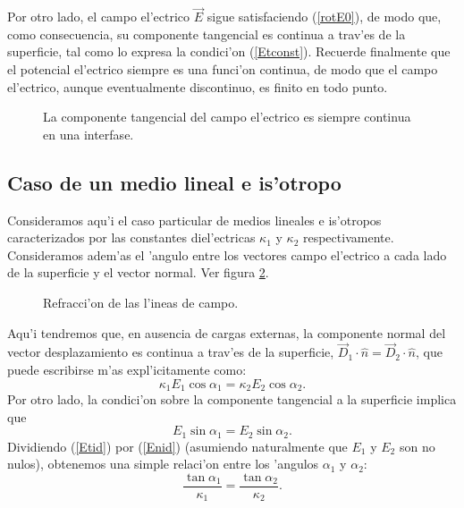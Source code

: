 Por otro lado, el campo el'ectrico $\vec{E}$ sigue satisfaciendo (\ref{rotE0}),
de modo que, como consecuencia, su componente tangencial es continua a trav'es
de la superficie, tal como lo expresa la condici'on (\ref{Etconst}). Recuerde
finalmente que el potencial el'ectrico siempre es una funci'on continua, de
modo que el campo el'ectrico, aunque eventualmente discontinuo, es finito en
todo punto.
\begin{figure}[!h]
\centerline{}
\caption{La componente tangencial del campo el'ectrico es siempre continua
en una interfase.}
\label{CF2}
\end{figure}

\subsection{Caso de un medio lineal e is'otropo}

Consideramos aqu'i el caso particular de medios lineales e is'otropos caracterizados por las constantes diel'ectricas $\kappa_1$ y $\kappa_2$ respectivamente. Consideramos adem'as el 'angulo entre los vectores campo el'ectrico a cada lado de la superficie y el vector normal. Ver figura \ref{CF3}. 
\begin{figure}[!h]
\centerline{}
\caption{Refracci'on de las l'ineas de campo.}
\label{CF3}
\end{figure}
Aqu'i tendremos que, en ausencia de cargas externas, la componente normal del vector desplazamiento es continua a trav'es de la superficie,  $\vec{D}_1\cdot\hat{n}=\vec{D}_2\cdot\hat{n}$, que puede escribirse m'as expl'icitamente como:
\begin{equation}\label{Enid}
\kappa_1 E_1\cos\alpha_1=\kappa_2E_2\cos\alpha_2.
\end{equation}
Por otro lado, la condici'on sobre la componente tangencial a la superficie implica que
\begin{equation} \label{Etid}
 E_1\sin\alpha_1=E_2\sin\alpha_2.
\end{equation}
Dividiendo (\ref{Etid}) por (\ref{Enid}) (asumiendo naturalmente que $E_1$ y $E_2$ son no nulos), obtenemos una simple relaci'on entre los 'angulos $\alpha_1$ y $\alpha_2$:
\begin{equation}
 \frac{\tan\alpha_1}{\kappa_1}=\frac{\tan\alpha_2}{\kappa_2}.
\end{equation}

